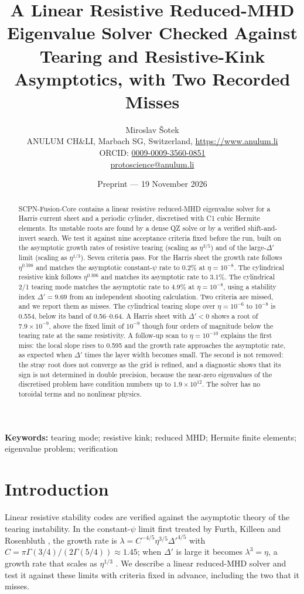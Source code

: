 \documentclass[11pt]{article}
\title{A Linear Resistive Reduced-MHD Eigenvalue Solver Checked Against
Tearing and Resistive-Kink Asymptotics, with Two Recorded Misses}
\author{Miroslav \v{S}otek\\
\small ANULUM CH\&LI, Marbach SG, Switzerland, \url{https://www.anulum.li}\\
\small ORCID: \href{https://orcid.org/0009-0009-3560-0851}{0009-0009-3560-0851}\\
\small \href{mailto:protoscience@anulum.li}{protoscience@anulum.li}}
\date{Preprint --- 19 November 2026}
\begin{document}
\maketitle

\begin{abstract}
SCPN-Fusion-Core contains a linear resistive reduced-MHD eigenvalue solver for
a Harris current sheet and a periodic cylinder, discretised with C1 cubic
Hermite elements.  Its unstable roots are found by a dense QZ solve or by a
verified shift-and-invert search.  We test it against nine acceptance criteria
fixed before the run, built on the asymptotic growth rates of resistive
tearing (scaling as $\eta^{3/5}$) and of the large-$\Delta'$ limit (scaling as
$\eta^{1/3}$).  Seven criteria pass.  For the Harris sheet the growth rate
follows $\eta^{0.598}$ and matches the asymptotic constant-$\psi$ rate to
0.2\% at $\eta = 10^{-8}$.  The cylindrical resistive kink follows
$\eta^{0.306}$ and matches its asymptotic rate to 3.1\%.  The cylindrical 2/1
tearing mode matches the asymptotic rate to 4.9\% at $\eta = 10^{-8}$, using a
stability index $\Delta' = 9.69$ from an independent shooting calculation.
Two criteria are missed, and we report them as misses.  The cylindrical
tearing slope over $\eta = 10^{-6}$ to $10^{-8}$ is 0.554, below its band of
0.56--0.64.  A Harris sheet with $\Delta' < 0$ shows a root of $7.9 \times
10^{-9}$, above the fixed limit of $10^{-9}$ though four orders of magnitude
below the tearing rate at the same resistivity.  A follow-up scan to $\eta =
10^{-10}$ explains the first miss: the local slope rises to 0.595 and the
growth rate approaches the asymptotic rate, as expected when $\Delta'$ times
the layer width becomes small.  The second is not removed: the stray root
does not converge as the grid is refined, and a diagnostic shows that its sign
is not determined in double precision, because the near-zero eigenvalues of
the discretised problem have condition numbers up to $1.9 \times 10^{12}$.
The solver has no toroidal terms and no nonlinear physics.
\end{abstract}

\noindent\textbf{Keywords:} tearing mode; resistive kink; reduced MHD; Hermite
finite elements; eigenvalue problem; verification

\section{Introduction}

Linear resistive stability codes are verified against the asymptotic theory
of the tearing instability.  In the constant-$\psi$ limit first treated by
Furth, Killeen and Rosenbluth \citep{FKR1963}, the growth rate is $\lambda =
C^{-4/5} \eta^{3/5} \Delta'^{4/5}$ with $C = \pi \Gamma(3/4) / (2 \Gamma(5/4))
\approx 1.45$; when $\Delta'$ is large it becomes $\lambda^3 = \eta$, a growth
rate that scales as $\eta^{1/3}$ \citep{BoldyrevLoureiro2018}.  We describe a
linear reduced-MHD solver and test it against these limits with criteria fixed
in advance, including the two that it misses.
\end{document}

